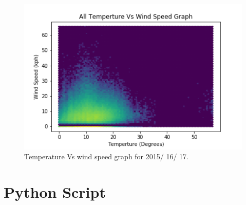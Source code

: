 \documentclass[12pt]{article}
\begin{document}
\begin{figure}[H]
\centering
\includegraphics[scale=1.0]{Graphs/All_Temperture_Vs_Wins_Speed.png}
\caption{Temperature Vs wind speed graph for 2015/ 16/ 17.}
\label{Temperature Vs Wind Speed graph for 2015/ 16/ 17.}
\end{figure}


\pagebreak
\section{Python Script}
\label{Python Script}
\end{document}
